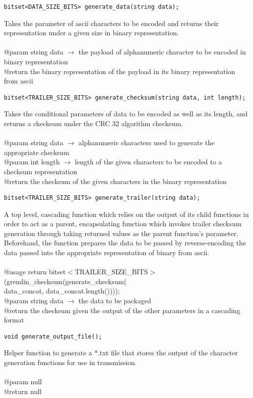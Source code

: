 \documentclass[12pt]{article}
\begin{document}
\begin{lstlisting}
bitset<DATA_SIZE_BITS> generate_data(string data);
\end{lstlisting}
Takes the parameter of ascii characters to be encoded and returns their representation under a given size in binary representation.\\\\
@param string data $\rightarrow$ the payload of alphanumeric character to be encoded in binary representation\\
@return the binary representation of the payload in its binary representation from ascii

\begin{lstlisting}
bitset<TRAILER_SIZE_BITS> generate_checksum(string data, int length);
\end{lstlisting}
Takes the conditional parameters of data to be encoded as well as its length, and returns a checksum under the CRC 32 algorithm checksum.\\\\
@param string data $\rightarrow$ alphanumeric characters used to generate the appropriate checksum\\
@param int length $\rightarrow$ length of the given characters to be encoded to a checksum representation\\
@return the checksum of the given characters in the binary representation

\begin{lstlisting}
bitset<TRAILER_SIZE_BITS> generate_trailer(string data);
\end{lstlisting}
A top level, cascading function which relies on the output of its child functions in order to act as a parent, encapsulating function which invokes trailer checksum generation through taking returned values as the parent function's parameter. Beforehand, the function prepares the data to be passed by reverse-encoding the data passed into the appropriate representation of binary from ascii.\\\\
@usage return bitset$<$TRAILER\_SIZE\_BITS$>$(gremlin\_checksum(generate\_checksum(
\\data\_concat, data\_concat.length())));\\
@param string data $\rightarrow$ the data to be packaged\\
@return the checksum given the output of the other parameters in a cascading format

\begin{lstlisting}
void generate_output_file();
\end{lstlisting}
Helper function to generate a *.txt file that stores the output of the character generation functions for use in transmission.\\\\
@param null\\
@return null
\end{document}
